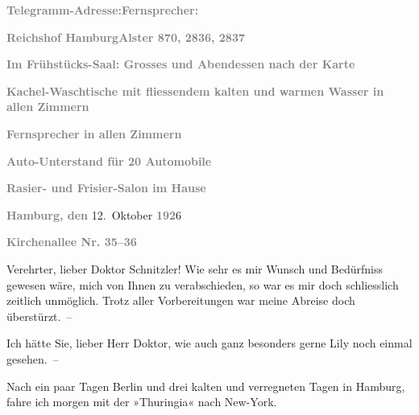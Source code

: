 \pstart
           \textcolor{gray}{\textbf{Telegramm-Adresse:}}\hfill \textcolor{gray}{\textbf{Fernsprecher:}}\pend
           
\pstart
           \textcolor{gray}{\textbf{Reichshof Hamburg}}\hfill \textcolor{gray}{\textbf{Alster 870, 2836, 2837}}\pend
           
\pstart
           \centering{}\textcolor{gray}{\textbf{Im Frühstücks-Saal: Grosses und Abendessen nach der
                     Karte}}\pend
           
\pstart
           \centering{}\textcolor{gray}{\textbf{Kachel-Waschtische mit fliessendem kalten und warmen Wasser
                     in allen Zimmern}}\pend
           
\pstart
           \textcolor{gray}{\textbf{Fernsprecher in allen Zimmern}}\pend
           
\pstart
           \textcolor{gray}{\textbf{Auto-Unterstand für 20 Automobile}}\pend
           
\pstart
           \textcolor{gray}{\textbf{Rasier- und Frisier-Salon im Hause}}\pend
           
\pstart
           \raggedleft{}\textcolor{gray}{\textbf{Hamburg, den}}{ }12. Oktober \textcolor{gray}{\textbf{192}}6\pend
           
\pstart
           \raggedleft{}\textcolor{gray}{\textbf{Kirchenallee Nr. 35–36}}\pend
           
\pstart{}Verehrter, lieber Doktor Schnitzler!\pend\vspace{0.5em}
\pstart
           Wie sehr es mir Wunsch und Bedürfniss gewesen wäre, mich von Ihnen zu verabschieden,
               so war es mir doch schliesslich zeitlich unmöglich. Trotz aller Vorbereitungen war
               meine Abreise doch überstürzt. –\pend
           
\pstart
           Ich hätte Sie, lieber Herr Doktor, wie auch ganz besonders gerne Lily noch einmal gesehen. –\pend
           
\pstart
           Nach ein paar Tagen Berlin und drei kalten und
               verregneten Tagen in Hamburg, fahre ich morgen
               mit der »Thuringia« nach New-York.\pend
           
